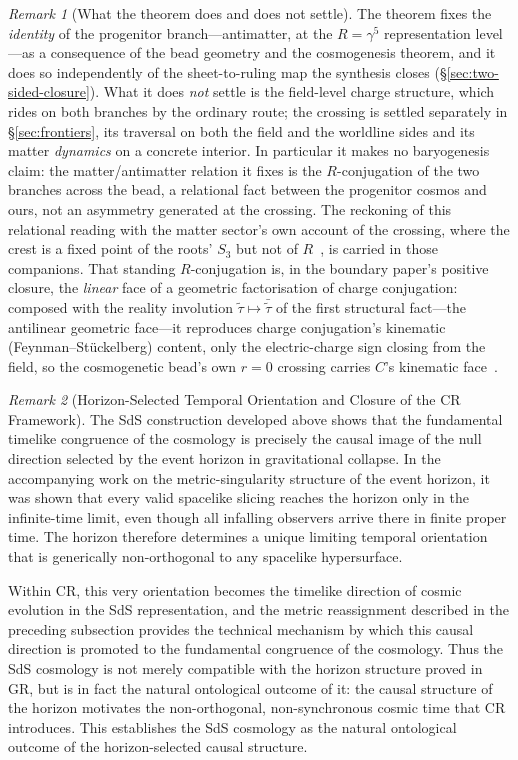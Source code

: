 \documentclass[11pt,a4paper]{article}
\theoremstyle{plain}
\theoremstyle{definition}
\theoremstyle{remark}
\newtheorem{remark}{Remark}
\begin{document}
\begin{remark}[What the theorem does and does not settle]
The theorem fixes the \emph{identity} of the progenitor branch---antimatter, at the $R=\gamma^5$ representation level---as a consequence of the bead geometry and the cosmogenesis theorem, and it does so independently of the sheet-to-ruling map the synthesis closes (\S\ref{sec:two-sided-closure}). What it does \emph{not} settle is the field-level charge structure, which rides on both branches by the ordinary route; the crossing is settled separately in \S\ref{sec:frontiers}, its traversal on both the field and the worldline sides and its matter \emph{dynamics} on a concrete interior. In particular it makes no baryogenesis claim: the matter/antimatter relation it fixes is the $R$-conjugation of the two branches across the bead, a relational fact between the progenitor cosmos and ours, not an asymmetry generated at the crossing. The reckoning of this relational reading with the matter sector's own account of the crossing, where the crest is a fixed point of the roots' $S_3$ but not of $R$~\cite{JanzenMatter,JanzenBoundary}, is carried in those companions. That standing $R$-conjugation is, in the boundary paper's positive closure, the \emph{linear} face of a geometric factorisation of charge conjugation: composed with the reality involution $\tilde\tau\mapsto\bar{\tilde\tau}$ of the first structural fact---the antilinear geometric face---it reproduces charge conjugation's kinematic (Feynman--St\"uckelberg) content, only the electric-charge sign closing from the field, so the cosmogenetic bead's own $r=0$ crossing carries $C$'s kinematic face~\cite{JanzenBoundary,JanzenMatter}.
\end{remark}

\begin{remark}[Horizon-Selected Temporal Orientation and Closure of the CR Framework]
The SdS construction developed above shows that the fundamental timelike congruence of the cosmology is precisely the causal image of the null direction selected by the event horizon in gravitational collapse. In the accompanying work on the metric-singularity structure of the event horizon, it was shown that every valid spacelike slicing reaches the horizon only in the infinite-time limit, even though all infalling observers arrive there in finite proper time. The horizon therefore determines a unique limiting temporal orientation that is generically non-orthogonal to any spacelike hypersurface. 

Within CR, this very orientation becomes the timelike direction of cosmic evolution in the SdS representation, and the metric reassignment described in the preceding subsection provides the technical mechanism by which this causal direction is promoted to the fundamental congruence of the cosmology. Thus the SdS cosmology is not merely compatible with the horizon structure proved in GR, but is in fact the natural ontological outcome of it: the causal structure of the horizon motivates the non-orthogonal, non-synchronous cosmic time that CR introduces. This establishes the SdS cosmology as the natural ontological outcome of the horizon-selected causal structure.
\end{remark}
\end{document}
